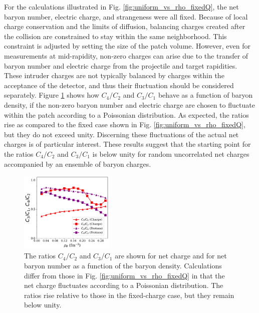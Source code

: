 For the calculations illustrated in Fig. \ref{fig:uniform_vs_rho_fixedQ}, the net baryon number, electric charge, and strangeness were all fixed. Because of local charge conservation and the limits of diffusion, balancing charges created after the collision are constrained to stay within the same neighborhood. This constraint is adjusted by setting the size of the patch volume. However, even for measurements at mid-rapidity, non-zero charges can arise due to the transfer of baryon number and electric charge from the projectile and target rapidities. These intruder charges are not typically balanced by charges within the acceptance of the detector, and thus their fluctuation should be considered separately. Figure \ref{fig:uniform_vs_rho_fluctuatingQ} shows how $C_4/C_2$ and $C_3/C_1$ behave as a function of baryon density, if the non-zero baryon number and electric charge are chosen to fluctuate within the patch according to a Poissonian distribution. As expected, the ratios rise as compared to the fixed case shown in Fig. \ref{fig:uniform_vs_rho_fixedQ}, but they do not exceed unity. Discerning these fluctuations of the actual net charges is of particular interest. These results suggest that the starting point for the ratios $C_4/C_2$ and $C_3/C_1$ is below unity for random uncorrelated net charges accompanied by an ensemble of baryon charges.
\begin{figure}
\centerline{\includegraphics[width=0.4\textwidth]{figs/m_vs_rho_fluctuatingQ}}
\caption{\label{fig:uniform_vs_rho_fluctuatingQ}
The ratios $C_4/C_2$ and $C_3/C_1$ are shown for net charge and for net baryon number as a function of the baryon density. Calculations differ from those in Fig. \ref{fig:uniform_vs_rho_fixedQ} in that the net charge fluctuates according to a Poissonian distribution. The ratios rise relative to those in the fixed-charge case, but they remain below unity.}
\end{figure}


%
